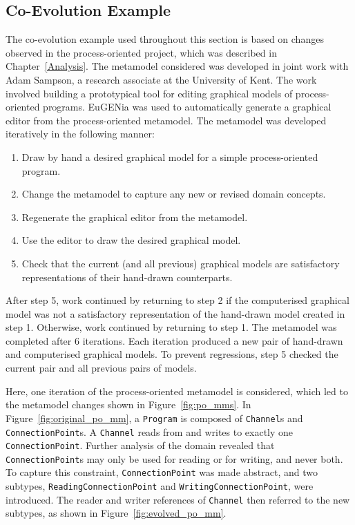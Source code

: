 \subsection{Co-Evolution Example}
The co-evolution example used throughout this section is based on changes observed in the process-oriented project, which was described in Chapter~\ref{Analysis}. The metamodel considered was developed in joint work with Adam Sampson, a research associate at the University of Kent. The work involved building a prototypical tool for editing graphical models of process-oriented programs. EuGENia \cite{kolovos09eugenia} was used to automatically generate a graphical editor from the process-oriented metamodel. The metamodel was developed iteratively in the following manner:

\begin{enumerate}
	\item Draw by hand a desired graphical model for a simple process-oriented program.
	\item Change the metamodel to capture any new or revised domain concepts.
	\item Regenerate the graphical editor from the metamodel.
	\item Use the editor to draw the desired graphical model.
	\item Check that the current (and all previous) graphical models are satisfactory representations of their hand-drawn counterparts.
\end{enumerate}

After step 5, work continued by returning to step 2 if the computerised graphical model was not a satisfactory representation of the hand-drawn model created in step 1. Otherwise, work continued by returning to step 1. The metamodel was completed after 6 iterations. Each iteration produced a new pair of hand-drawn and computerised graphical models. To prevent regressions, step 5 checked the current pair and all previous pairs of models.

Here, one iteration of the process-oriented metamodel is considered, which led to the metamodel changes shown in Figure~\ref{fig:po_mms}. In Figure~\ref{fig:original_po_mm}, a \texttt{Pr\-og\-r\-am} is composed of \texttt{Channel}s and \texttt{Co\-nn\-ec\-ti\-onPo\-in\-t}s. A \texttt{Ch\-an\-n\-el} reads from and writes to exactly one \texttt{Co\-nn\-ec\-ti\-o\-nPo\-i\-nt}. Further analysis of the domain revealed that \texttt{Co\-nn\-ec\-ti\-o\-nPo\-i\-nt}s may only be used for reading or for writing, and never both. To capture this constraint, \texttt{Co\-nn\-ec\-ti\-o\-nPo\-i\-nt} was made abstract, and two subtypes, \texttt{Re\-ad\-i\-ngCo\-nn\-ec\-ti\-o\-nPo\-i\-nt} and \texttt{Wr\-i\-ti\-ngCo\-nn\-ec\-ti\-o\-nPo\-i\-nt}, were introduced. The reader and writer references of \texttt{Ch\-an\-n\-el} then referred to the new subtypes, as shown in Figure~\ref{fig:evolved_po_mm}.

